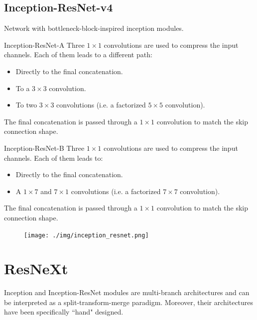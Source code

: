 \subsection{Inception-ResNet-v4}

Network with bottleneck-block-inspired inception modules.

\begin{descriptionlist}
    \item[Inception-ResNet-A] 
        Three $1 \times 1$ convolutions are used to compress the input channels. Each of them leads to a different path:
        \begin{itemize}
            \item Directly to the final concatenation.
            \item To a $3 \times 3$ convolution.
            \item To two $3 \times 3$ convolutions (i.e. a factorized $5 \times 5$ convolution). 
        \end{itemize}
        The final concatenation is passed through a $1 \times 1$ convolution to match the skip connection shape.

    \item[Inception-ResNet-B] 
        Three $1 \times 1$ convolutions are used to compress the input channels. Each of them leads to:
        \begin{itemize}
            \item Directly to the final concatenation.
            \item A $1 \times 7$ and $7 \times 1$ convolutions (i.e. a factorized $7 \times 7$ convolution). 
        \end{itemize}
        The final concatenation is passed through a $1 \times 1$ convolution to match the skip connection shape.
\end{descriptionlist}

\begin{figure}[H]
    \centering
    \texttt{[image: ./img/inception\_resnet.png]}
\end{figure}


\graphicspath{{.}}



\section{ResNeXt}

\begin{remark}
    Inception and Inception-ResNet modules are multi-branch architectures and can be interpreted as a split-transform-merge paradigm. Moreover, their architectures have been specifically ``hand" designed.
\end{remark}

